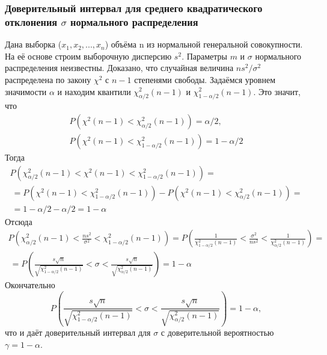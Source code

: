 \subsubsection{Доверительный интервал для среднего квадратического отклонения $\sigma$ нормального распределения}
Дана выборка ($x_{1},x_{2}, ... ,x_{n}$) объёма n из нормальной генеральной совокупности. На её основе строим выборочную дисперсию $s^{2}$. Параметры $m$ и $\sigma$ нормального распределения неизвестны. Доказано, что случайная величина $ns^{2}/\sigma^{2}$ распределена по закону $\chi^{2}$ с $n-1$ степенями свободы.
\newline
Задаёмся уровнем значимости $\alpha$ и находим квантили $\chi^{2}_{\alpha/2}(n-1)$ и $\chi^{2}_{1-\alpha/2}(n-1)$.
\newline
Это значит, что 
\begin{equation}
    \begin{split}
    P\left(\chi^{2}(n-1) < \chi^{2}_{\alpha/2}(n-1)\right) = \alpha/2, \\
    P\left(\chi^{2}(n-1) < \chi^{2}_{1-\alpha/2}(n-1)\right) = 1-\alpha/2
    \end{split}
    \label{P_chi_2x2}        
\end{equation}
Тогда
\begin{multline}
     P\left(\chi^{2}_{\alpha/2}(n-1) < \chi^{2}(n-1) < \chi^{2}_{1-\alpha/2}(n-1)\right) = \\\ =
      P\left(\chi^{2}(n-1) < \chi^{2}_{1-\alpha/2}(n-1)\right) -P\left(\chi^{2}(n-1) < \chi^{2}_{\alpha/2}(n-1)\right) = \\\ = 1 - \alpha/2 -\alpha/2 = 1 - \alpha
      \label{P_chi_2}
\end{multline}
Отсюда
\begin{multline}
     P\left(\chi^{2}_{\alpha/2}(n-1) < \frac{ns^{2}}{\sigma^{2}} < \chi^{2}_{1-\alpha/2}(n-1)\right) =
      P\left(\frac{1}{\chi^{2}_{1-\alpha/2}(n-1)} < \frac{\sigma^{2}}{ns^{2}} < \frac{1}{\chi^{2}_{\alpha/2}(n-1)} \right) = \\\ =
      P\left(\frac{s\sqrt{n}}{\sqrt{\chi^{2}_{1-\alpha/2}(n-1)}} < \sigma <  \frac{s\sqrt{n}}{\sqrt{\chi^{2}_{\alpha/2}(n-1)}}\right) = 1- \alpha
      \label{interv}
\end{multline}
Окончательно
\begin{equation}
     P\left(\frac{s\sqrt{n}}{\sqrt{\chi^{2}_{1-\alpha/2}(n-1)}} < \sigma <  \frac{s\sqrt{n}}{\sqrt{\chi^{2}_{\alpha/2}(n-1)}}\right) = 1- \alpha,
     \label{fin_interval}
\end{equation}
что и даёт доверительный интервал для $\sigma$ с доверительной вероятностью $\gamma = 1 - \alpha$.

